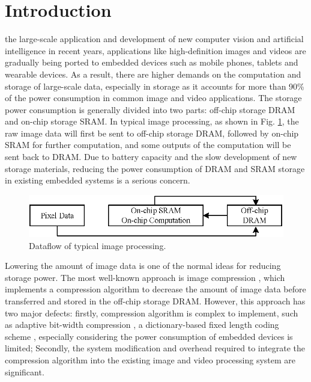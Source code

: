 \documentclass[lettersize,journal]{IEEEtran}
\begin{document}
\section{Introduction}
 the large-scale application and development of new computer vision and artificial intelligence in recent years, applications like high-definition images and videos are gradually being ported to embedded devices such as mobile phones, tablets and wearable devices. As a result, there are higher demands on the computation and storage of large-scale data, especially in storage as it accounts for more than 90\% of the power consumption \cite{7560228,culler1999parallel} in common image and video applications. The storage power consumption is generally divided into two parts: off-chip storage DRAM and on-chip storage SRAM. In typical image processing, as shown in Fig. \ref{fig1}, the raw image data will first be sent to off-chip storage DRAM, followed by on-chip SRAM for further computation, and some outputs of the computation will be sent back to DRAM. Due to battery capacity and the slow development of new storage materials, reducing the power consumption of DRAM and SRAM storage in existing embedded systems is a serious concern.
\begin{figure}[htb]
\centering
\includegraphics[width=\linewidth]{Fig/Dataflow of typical image processing.png}
\caption{Dataflow of typical image processing.}
\label{fig1}
\end{figure}

Lowering the amount of image data is one of the normal ideas for reducing storage power. The most well-known approach is image compression \cite{4607562}, which implements a compression algorithm to decrease the amount of image data before  transferred and stored in the off-chip storage DRAM. However, this approach has two major defects: firstly, compression algorithm is complex to implement, such as adaptive bit-width compression \cite{1435140}, a dictionary-based fixed length coding scheme \cite{4590164}, especially considering the power consumption of embedded devices is limited; Secondly, the system modification and overhead required to integrate the compression algorithm into the existing image and video processing system are significant.
\end{document}
